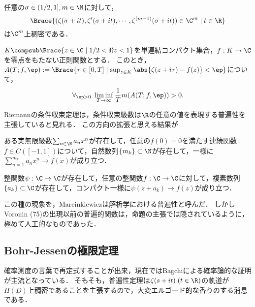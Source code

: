 \documentclass[uplatex, dvipdfmx]{jsreport}
\begin{document}
\begin{proposition}[Voronin]
    任意の$\sigma\in(1/2,1],m\in\N$に対して，
    \[\Brace{(\zeta(\sigma+it),\zeta'(\sigma+it),\cdots,\zeta^{(m-1)}(\sigma+it))\in\C^m\mid t\in\R}\]
    は$\C^m$上稠密である．
\end{proposition}

\begin{theorem}[Voronin (1975)]
    $K\compsub\Brace{z\in\C\mid1/2<\Re z<1}$を単連結コンパクト集合，$f:K\to\C$を零点をもたない正則関数とする．
    このとき，$A(T;f,\ep):=\Brace{\tau\in[0,T]\mid\sup_{z\in K}\abs{\zeta(z+i\tau)-f(z)}<\ep}$について，
    \[\forall_{\ep>0}\;\liminf_{T\to\infty}\frac{1}{T}m(A(T;f,\ep))>0.\]
\end{theorem}
\begin{remarks}
    Riemannの条件収束定理は，条件収束級数は$\R$の任意の値を表現する普遍性を主張していると見れる．
    この方向の拡張と思える結果が
    \begin{proposition}[Fekete (1915)]
        ある実無限級数$\sum_{n\in\N}a_nx^n$が存在して，任意の$f(0)=0$を満たす連続関数$f\in C([-1,1])$について，自然数列$\{m_k\}\subset\N$が存在して，一様に$\sum_{n=1}^{m_k}a_nx^n\to f(x)$が成り立つ．
    \end{proposition}
    \begin{proposition}[Brikhoff]
        整関数$\psi:\C\to\C$が存在して，任意の整関数$f:\C\to\C$に対して，複素数列$\{a_k\}\subset\C$が存在して，コンパクト一様に$\psi(z+a_k)\to f(z)$が成り立つ．
    \end{proposition}
    この種の現象を，Marcinkiewiczは解析学における普遍性と呼んだ．
    しかしVoronin (75)の出現以前の普遍的関数は，命題の主張では隠されているように，極めて人工的なものであった．
\end{remarks}

\subsection{Bohr-Jessenの極限定理}

\begin{tcolorbox}[colframe=ForestGreen, colback=ForestGreen!10!white,breakable,colbacktitle=ForestGreen!40!white,coltitle=black,fonttitle=\bfseries\sffamily,
title=]
    確率測度の言葉で再定式することが出来，現在ではBagchiによる確率論的な証明が主流となっている．
    そもそも，普遍性定理は$\zeta(s+it)\;(t\in\R)$の軌道が$H(D)$上稠密であることを主張するので，大変エルゴード的な香りのする消息である．
\end{tcolorbox}
\end{document}
